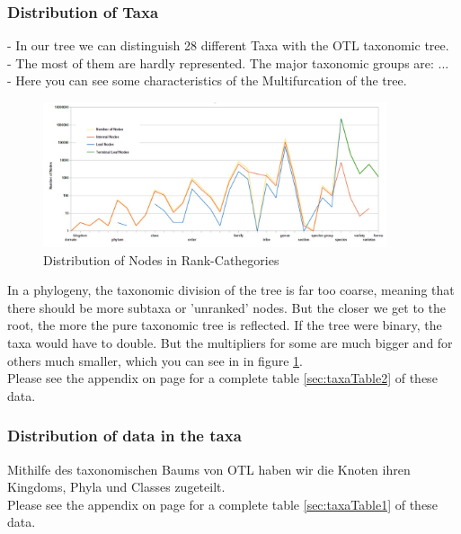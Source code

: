       \subsubsection{Distribution of Taxa}
        - In our tree we can distinguish 28 different Taxa with the OTL taxonomic tree. \\
        - The most of them are hardly represented. The major taxonomic groups are: ... \\
        - Here you can see some characteristics of the Multifurcation of the tree. \\
        \begin{figure}[h!]
          \centering
          \includegraphics[width=0.9\textwidth]{Figures/TaxaTable2.JPG}
          \caption{Distribution of Nodes in Rank-Cathegories}
          \label{fig:taxaTable2}
        \end{figure}
        In a phylogeny, the taxonomic division of the tree is far too coarse, meaning that there should 
          be more subtaxa or 'unranked' nodes. But the closer we get to the root, the more the pure
          taxonomic tree is reflected. If the tree were binary, the taxa would have to double. But the 
          multipliers for some are much bigger and for others much smaller, which you can see in in figure 
          \ref{fig:taxaTable2}. \\
        Please see the appendix on page \pageref{sec:taxaTable2} for a complete table \ref{sec:taxaTable2} 
          of these data. \\

      \subsubsection{Distribution of data in the taxa}
        Mithilfe des taxonomischen Baums von OTL haben wir die Knoten ihren Kingdoms, Phyla und Classes 
          zugeteilt. \\
        Please see the appendix on page \pageref{sec:taxaTable1} for a complete table \ref{sec:taxaTable1} 
          of these data. \\
         \\
         \\

